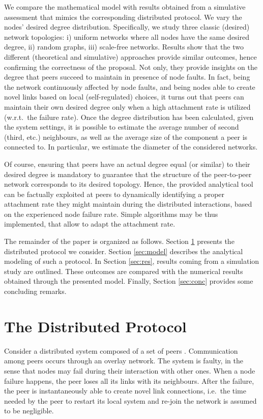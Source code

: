 \documentclass[a4paper,twosided]{article}
\begin{document}
We compare the mathematical model with results obtained from a simulative assessment that mimics the corresponding distributed protocol. We vary the nodes' desired degree distribution. Specifically, we study three classic (desired) network topologies: i) uniform networks where all nodes have the same desired degree, ii) random graphs, iii) scale-free networks. Results show that the two different (theoretical and simulative) approaches provide similar outcomes, hence confirming the correctness of the proposal. Not only, they provide insights on the degree that peers succeed to maintain in presence of node faults. In fact, being the network continuously affected by node faults, and being nodes able to create novel links based on local (self-regulated) choices, it turns out that peers can maintain their own desired degree only when a high attachment rate is utilized (w.r.t.~the failure rate). 
Once the degree distribution has been calculated, given the system settings, it is possible to estimate
the average number of second (third, etc.) neighbours, as well as the average size of the component a peer is connected to. In particular, we estimate the diameter of the considered networks.

Of course, ensuring that peers have an actual degree equal (or similar) to their desired degree is mandatory to guarantee that the structure of the peer-to-peer network corresponds to its desired topology.
Hence, the provided analytical tool can be factually exploited at peers to dynamically identifying a proper attachment rate they might maintain during the distributed interactions, based on the experienced node failure rate.
Simple algorithms may be thus implemented, that allow to adapt the attachment rate.

The remainder of the paper is organized as follows. Section \ref{sec:protocol} presents the distributed protocol we consider. Section \ref{sec:model} describes the analytical modeling of such a protocol. In Section \ref{sec:res}, results coming from a simulation study are outlined. These outcomes are compared with the numerical results obtained through the presented model. Finally, Section \ref{sec:conc} provides some concluding remarks.


\section{The Distributed Protocol}
\label{sec:protocol}

Consider a distributed system composed of a set of peers . Communication amo\-ng peers occurs through an overlay network. The system is faulty, in the sense that nodes may fail during their interaction with other ones. When a node failure happens, the peer loses all its links with its neighbours. After the failure, the peer is instantaneously able to create novel link connections, i.e.~the time needed by the peer to restart its local system and re-join the network is assumed to be negligible.
\end{document}

